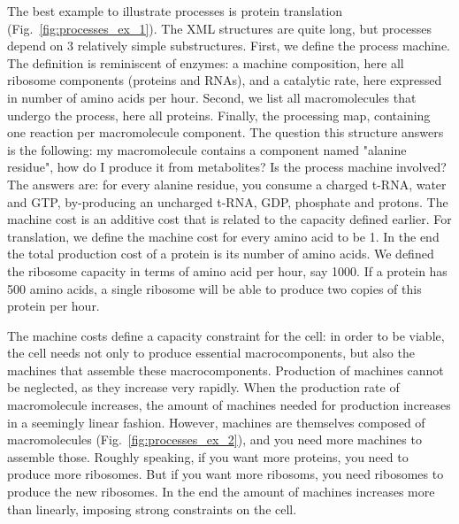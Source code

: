 The best example to illustrate processes is protein translation
(Fig.~\ref{fig:processes_ex_1}).
The XML structures are quite long, but processes depend on 3 relatively
simple substructures.
First, we define the process machine.
The definition is reminiscent of enzymes:
a machine composition, here all ribosome components (proteins and RNAs),
and a catalytic rate, here expressed in number of amino acids per hour.
Second, we list all macromolecules that undergo the process, here all proteins.
Finally, the processing map, containing one reaction per macromolecule component.
The question this structure answers is the following:
my macromolecule contains a component named "alanine residue",
how do I produce it from metabolites? Is the process machine involved?
The answers are: for every alanine residue, you consume a charged t-RNA,
water and GTP, by-producing an uncharged t-RNA, GDP, phosphate and protons.
The machine cost is an additive cost that is related to the capacity defined earlier.
For translation, we define the machine cost for every amino acid to be 1.
In the end the total production cost of a protein is its number of amino acids.
We defined the ribosome capacity in terms of amino acid per hour, say 1000.
If a protein has 500 amino acids, a single ribosome will be able to produce
two copies of this protein per hour.

The machine costs define a capacity constraint for the cell:
in order to be viable, the cell needs not only to produce essential macrocomponents,
but also the machines that assemble these macrocomponents.
Production of machines cannot be neglected, as they increase very rapidly.
When the production rate of macromolecule increases,
the amount of machines needed for production increases in a seemingly linear fashion.
However, machines are themselves composed of macromolecules (Fig.~\ref{fig:processes_ex_2}),
and you need more machines to assemble those.
Roughly speaking, if you want more proteins, you need to produce more ribosomes.
But if you want more ribosoms, you need ribosomes to produce the new ribosomes.
In the end the amount of machines increases more than linearly,
imposing strong constraints on the cell.

